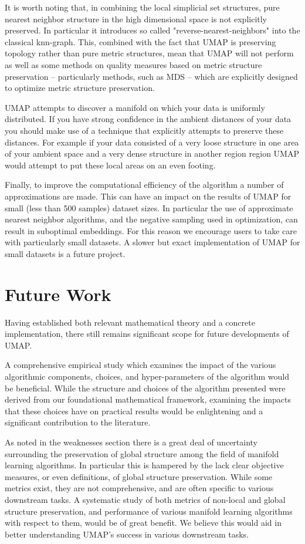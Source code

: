 \documentclass[12pt]{article}
\begin{document}
It is worth noting that, in combining the local simplicial set structures, pure nearest neighbor structure in the high dimensional space is not explicitly preserved. In particular it introduces so called "reverse-nearest-neighbors" into the classical knn-graph. This, combined with the fact that UMAP is preserving topology rather than pure metric structures, mean that UMAP will not perform as well as some methods on quality measures based on metric structure preservation -- particularly methods, such as MDS -- which are explicitly designed to optimize metric structure preservation.

UMAP attempts to discover a manifold on which your data is uniformly distributed.  If you have strong confidence in the ambient distances of your data you should make use of a technique that explicitly attempts to preserve these distances.  For example if your data consisted of a very loose structure in one area of your ambient space and a very dense structure in another region region UMAP would attempt to put these local areas on an even footing.

Finally, to improve the computational efficiency of the algorithm a number of approximations are made. This can have an impact on the results of UMAP for small (less than 500 samples) dataset sizes. In particular the use of approximate nearest neighbor algorithms, and the negative sampling used in optimization, can result in suboptimal embeddings. For this reason we encourage users to take care with particularly small datasets. A slower but exact implementation of UMAP for small datasets is a future project.

\section{Future Work}\label{future}

Having established both relevant mathematical theory and a concrete implementation, there still remains significant scope for future developments of UMAP. 

A comprehensive empirical study which examines the impact of the various algorithmic components, choices, and hyper-parameters of the algorithm would be beneficial. While the structure and choices of the algorithm presented were derived from our foundational mathematical framework, examining the impacts that these choices have on practical results would be enlightening and a significant contribution to the literature.

As noted in the weaknesses section there is a great deal of uncertainty surrounding the preservation of global structure among the field of manifold learning algorithms. In particular this is hampered by the lack clear objective measures, or even definitions, of global structure preservation. While some metrics exist, they are not comprehensive, and are often specific to various downstream tasks. A systematic study of both metrics of non-local and global structure preservation, and performance of various manifold learning algorithms with respect to them, would be of great benefit. We believe this would aid in better understanding UMAP's success in  various downstream tasks.
\end{document}
